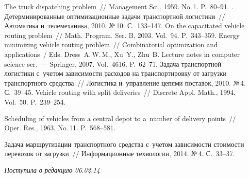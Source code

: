 \begin{multicols}{2}
{\small\frenchspacing
 {%
 \begin{thebibliography}{9}
 The truck dispatching problem~// Management
Sci., 1959. No.\,1. P.~80--91.
. Детерминированные оптимизационные
задачи транспортной логистики~// Автоматика и~телемеханика, 2010. №\,10.
С.~133--147.
 On the
capacitated vehicle routing problem~// Math. Program. Ser. B, 2003. Vol.~94.
P.~343--359.
 Energy minimizing vehicle routing
problem~// Combinatorial optimization and applications~/
Eds. Dress~A.\,W.\,M., Xu~Y., Zhu~B.
Lecture notes in computer science ser.~--- Springer, 2007. Vol.~4616.
P.~62--71.
 Задача транспортной логистики с~учетом
зависимости расходов на транспортировку от загрузки транспортного
средства~// Логистика и~управление цепями поставок, 2010. №\,4. С.~39--45.
 Vehicle routing with split deliveries~//
Discrete Appl. Math., 1994. Vol.~50. P.~239--254.

 Scheduling of vehicles from a central depot to a~number
of delivery points~// Oper. Res., 1963. No.\,11. P.~568--581.

 Задача маршрутизации транспортного
средства с~учетом зависимости стоимости перевозок от загрузки~//
Информационные технологии, 2014. №\,4. С.~33--37.

 \end{thebibliography}

 }
 }

\end{multicols}

\vspace*{-3pt}

\hfill{\small\textit{Поступила в редакцию 06.02.14}}

\newpage






